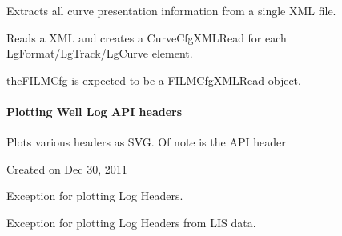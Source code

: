 \documentclass[letterpaper,10pt,english]{sphinxmanual}
\begin{document}

\begin{fulllineitems}
\label{\detokenize{ref/util/plot/PRESCfgXML:TotalDepth.util.plot.PRESCfgXML.PresCfgXMLRead}}
Extracts all curve presentation information from a single XML file.

\begin{fulllineitems}
\label{\detokenize{ref/util/plot/PRESCfgXML:TotalDepth.util.plot.PRESCfgXML.PresCfgXMLRead.__init__}}
Reads a XML and creates a CurveCfgXMLRead for
each LgFormat/LgTrack/LgCurve element.

theFILMCfg is expected to be a FILMCfgXMLRead object.

\end{fulllineitems}


\end{fulllineitems}



\paragraph{Plotting Well Log API headers}
\label{\detokenize{ref/util/plot/LogHeader:plotting-well-log-api-headers}}\label{\detokenize{ref/util/plot/LogHeader:module-TotalDepth.util.plot.LogHeader}}\label{\detokenize{ref/util/plot/LogHeader::doc}}
Plots various headers as SVG. Of note is the API header

Created on Dec 30, 2011

\begin{fulllineitems}
\label{\detokenize{ref/util/plot/LogHeader:TotalDepth.util.plot.LogHeader.ExceptionLogHeader}}
Exception for plotting Log Headers.

\end{fulllineitems}


\begin{fulllineitems}
\label{\detokenize{ref/util/plot/LogHeader:TotalDepth.util.plot.LogHeader.ExceptionLogHeaderLIS}}
Exception for plotting Log Headers from LIS data.

\end{fulllineitems}
\end{document}
